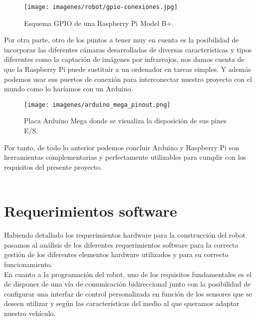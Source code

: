 \begin{figure}[H]
  \begin{center}
    \texttt{[image: imagenes/robot/gpio-conexiones.jpg]}
  \end{center}
  \caption{Esquema GPIO de una Raspberry Pi Model B+.}
  \label{gantt:tareas01}
\end{figure}

Por otra parte, otro de los puntos a tener muy en cuenta es la posibilidad de incorporar las diferentes cámaras desarrolladas de diversas características y tipos diferentes como
la captación de imágenes por infrarrojos, nos damos cuenta de que la Raspberry Pi puede sustituir a un ordenador en tareas simples. Y además podemos usar sus puertos de conexión
para interconectar nuestro proyecto con el mundo como lo haríamos con un Arduino.\\

\begin{figure}[H]
  \begin{center}
    \texttt{[image: imagenes/arduino\_mega\_pinout.png]}
  \end{center}
  \caption{Placa Arduino Mega donde se visualiza la disposición de sus pines E/S.}
  \label{gantt:tareas01}
\end{figure}

Por tanto, de todo lo anterior podemos concluir Arduino y Raspberry Pi son herramientas complementarias y perfectamente utilizables para cumplir con los requisitos del presente proyecto.\\\\


\section{Requerimientos software}
\label{sec:requerimientos-software}

Habiendo detallado los requerimientos hardware para la construcción del robot pasamos al análisis de los diferentes requerimientos software para la correcta
gestión de los diferentes elementos hardware utilizados y para su correcto funcionamiento.\\

En cuanto a la programación del robot, uno de los requisitos fundamentales es el de disponer de una vía de comunicación bidireccional junto con la posibilidad de
configurar una interfaz de control personalizada en función de los sensores que se deseen utilizar y según las características del medio al que queramos adaptar nuestro vehículo.\\

